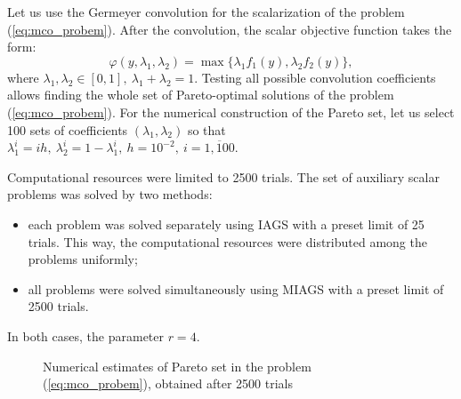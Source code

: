 \documentclass[runningheads]{llncs}
\begin{document}
Let us use the Germeyer convolution for the scalarization of the problem
(\ref{eq:mco_probem}).
After the convolution, the scalar objective function takes the form:
\begin{equation}
  \varphi(y,\lambda_1,\lambda_2)=\max\{\lambda_1 f_1(y), \lambda_2 f_2(y)\},
\end{equation}
where \(\lambda_1,\lambda_2\in[0,1],\: \lambda_1+\lambda_2=1\).
Testing all possible convolution coefficients allows finding the whole set of Pareto-optimal
solutions of the problem (\ref{eq:mco_probem}).
For the numerical construction of the Pareto set, let us select 100 sets of coefficients
\((\lambda_1,\lambda_2)\) so that
\(\lambda_1^i=i h,\: \lambda_2^i=1-\lambda_1^i,\: h=10^{-2},\: i=\overline{1, 100}\).

Computational resources were limited to 2500 trials.
The set of auxiliary scalar problems was solved by two methods:
\begin{itemize}
  \item each problem was solved separately using IAGS with a preset limit of 25 trials. This way,
the computational resources were distributed among the problems uniformly;
  \item all problems were solved simultaneously using MIAGS with a preset limit of
2500 trials.
\end{itemize}
In both cases, the parameter \(r=4\).

\begin{figure}[ht]
    \centering
    \caption{Numerical estimates of Pareto set in the problem (\ref{eq:mco_probem}), obtained
after 2500 trials}
    \label{fig:mco_pareto}
\end{figure}
\end{document}
